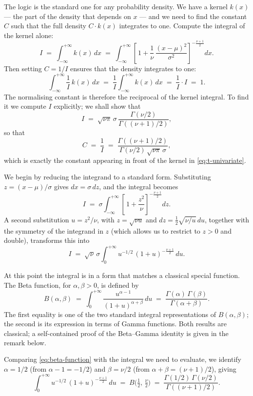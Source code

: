 \documentclass[11pt, a4paper, oneside]{article}
\begin{document}
The logic is the standard one for any probability density. We have a
kernel $k(x)$ — the part of the density that depends on $x$ — and we
need to find the constant $C$ such that the full density $C \cdot k(x)$
integrates to one. Compute the integral of the kernel alone:
\begin{equation}
I \;=\; \int_{-\infty}^{+\infty} k(x)\, dx
\;=\; \int_{-\infty}^{+\infty}
\left[\,1 + \frac{1}{\nu}\,\frac{(x-\mu)^2}{\sigma^2}\right]^{-\tfrac{\nu+1}{2}} dx.
\label{eq:int-t-kernel}
\end{equation}
Then setting $C = 1/I$ ensures that the density integrates to one:
\[
\int_{-\infty}^{+\infty} \frac{1}{I}\, k(x)\, dx
\;=\; \frac{1}{I} \int_{-\infty}^{+\infty} k(x)\, dx
\;=\; \frac{1}{I} \cdot I \;=\; 1.
\]
The normalising constant is therefore the reciprocal of the kernel
integral. To find it we compute $I$ explicitly; we shall show that
\[
I \;=\; \sqrt{\nu\pi}\,\sigma\,\frac{\Gamma(\nu/2)}{\Gamma((\nu+1)/2)},
\]
so that
\[
C \;=\; \frac{1}{I} \;=\; \frac{\Gamma((\nu+1)/2)}{\Gamma(\nu/2)\,\sqrt{\nu\pi}\,\sigma},
\]
which is exactly the constant appearing in front of the kernel in
\eqref{eq:t-univariate}.


We begin by reducing the integrand to a standard form. Substituting
$z = (x - \mu)/\sigma$ gives $dx = \sigma\,dz$, and the integral becomes
\[
I \;=\; \sigma \int_{-\infty}^{+\infty}
\left[\,1 + \frac{z^2}{\nu}\right]^{-\tfrac{\nu+1}{2}} dz.
\]
A second substitution $u = z^2/\nu$, with $z = \sqrt{\nu u}$ and
$dz = \tfrac{1}{2}\sqrt{\nu/u}\,du$, together with the symmetry of the
integrand in $z$ (which allows us to restrict to $z > 0$ and double),
transforms this into
\[
I \;=\; \sqrt{\nu}\,\sigma
\int_{0}^{+\infty} u^{-1/2}\, (1 + u)^{-\tfrac{\nu+1}{2}}\, du.
\]

At this point the integral is in a form that matches a classical special
function. The Beta function, for $\alpha, \beta > 0$, is defined by
\begin{equation}
B(\alpha, \beta) \;=\; \int_{0}^{+\infty} \frac{u^{\alpha - 1}}{(1 + u)^{\alpha + \beta}}\, du
\;=\; \frac{\Gamma(\alpha)\,\Gamma(\beta)}{\Gamma(\alpha + \beta)}.
\label{eq:beta-function}
\end{equation}
The first equality is one of the two standard integral representations
of $B(\alpha, \beta)$; the second is its expression in terms of Gamma
functions. Both results are classical; a self-contained proof of the
Beta–Gamma identity is given in the remark below.

Comparing \eqref{eq:beta-function} with the integral we need to
evaluate, we identify $\alpha = 1/2$ (from $\alpha - 1 = -1/2$) and
$\beta = \nu/2$ (from $\alpha + \beta = (\nu+1)/2$), giving
\[
\int_{0}^{+\infty} u^{-1/2}\, (1 + u)^{-\tfrac{\nu+1}{2}}\, du
\;=\; B\!\big(\tfrac{1}{2},\, \tfrac{\nu}{2}\big)
\;=\; \frac{\Gamma(1/2)\,\Gamma(\nu/2)}{\Gamma((\nu+1)/2)}.
\]
\end{document}
